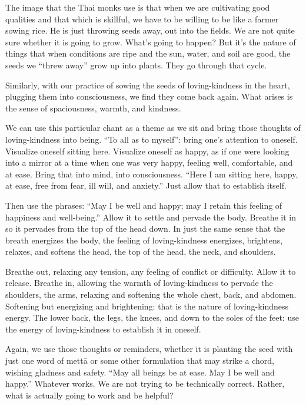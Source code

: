 The image that the Thai monks use is that when we are cultivating good
qualities and that which is skillful, we have to be willing to be like a
farmer sowing rice. He is just throwing seeds away, out into the fields.
We are not quite sure whether it is going to grow. What’s going to
happen? But it’s the nature of things that when conditions are ripe and
the sun, water, and soil are good, the seeds we “threw away” grow up
into plants. They go through that cycle.

Similarly, with our practice of sowing the seeds of loving-kindness in
the heart, plugging them into consciousness, we find they come back
again. What arises is the sense of spaciousness, warmth, and kindness.

We can use this particular chant as a theme as we sit and bring those
thoughts of loving-kindness into being. “To all as to myself”: bring
one’s attention to oneself. Visualize oneself sitting here. Visualize
oneself as happy, as if one were looking into a mirror at a time when
one was very happy, feeling well, comfortable, and at ease. Bring that
into mind, into consciousness. “Here I am sitting here, happy, at ease,
free from fear, ill will, and anxiety.” Just allow that to establish
itself.

Then use the phrases: “May I be well and happy; may I retain this
feeling of happiness and well-being.” Allow it to settle and pervade the
body. Breathe it in so it pervades from the top of the head down. In
just the same sense that the breath energizes the body, the feeling of
loving-kindness energizes, brightens, relaxes, and softens the head, the
top of the head, the neck, and shoulders.

Breathe out, relaxing any tension, any feeling of conflict or
difficulty. Allow it to release. Breathe in, allowing the warmth of
loving-kindness to pervade the shoulders, the arms, relaxing and
softening the whole chest, back, and abdomen. Softening but energizing
and brightening: that is the nature of loving-kindness energy. The lower
back, the legs, the knees, and down to the soles of the feet: use the
energy of loving-kindness to establish it in oneself.

Again, we use those thoughts or reminders, whether it is planting the
seed with just one word of mettā or some other formulation that may
strike a chord, wishing gladness and safety. “May all beings be at ease.
May I be well and happy.” Whatever works. We are not trying to be
technically correct. Rather, what is actually going to work and be
helpful?

